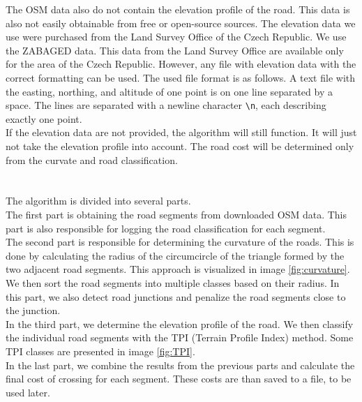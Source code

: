             The OSM data also do not contain the elevation profile of the road. This data is also not easily obtainable from free or open-source sources. The elevation data we use were purchased from the Land Survey Office of the Czech Republic. We use the ZABAGED\cite{ZABAGED} data. This data from the Land Survey Office are available only for the area of the Czech Republic. However, any file with elevation data with the correct formatting can be used. The used file format is as follows. A text file with the easting, northing, and altitude of one point is on one line separated by a space. The lines are separated with a newline character \texttt{\textbackslash n}, each describing exactly one point.\\
            If the elevation data are not provided, the algorithm will still function. It will just not take the elevation profile into account. The road cost will be determined only from the curvate and road classification.\\\\
        \\
            The algorithm is divided into several parts.\\
            The first part is obtaining the road segments from downloaded OSM data. This part is also responsible for logging the road classification for each segment.\\
            The second part is responsible for determining the curvature of the roads. This is done by calculating the radius of the circumcircle of the triangle formed by the two adjacent road segments. This approach is visualized in image \ref{fig:curvature}. We then sort the road segments into multiple classes based on their radius. In this part, we also detect road junctions and penalize the road segments close to the junction.\\
            In the third part, we determine the elevation profile of the road. We then classify the individual road segments with the TPI (Terrain Profile Index) method. Some TPI classes are presented in image \ref{fig:TPI}.\\
            In the last part, we combine the results from the previous parts and calculate the final cost of crossing for each segment. These costs are than saved to a file, to be used later.\\\\
